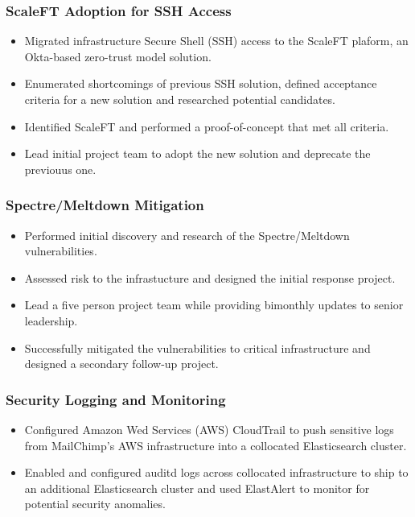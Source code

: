 \documentclass[letterpaper]{article}
\begin{document}
\subsubsection*{ScaleFT Adoption for SSH Access}
\begin{itemize}[noitemsep]
	\item Migrated infrastructure Secure Shell (SSH) access to the ScaleFT plaform, an Okta-based zero-trust model solution.
	\item Enumerated shortcomings of previous SSH solution, defined acceptance criteria for a new solution and researched potential candidates.
	\item Identified ScaleFT and performed a proof-of-concept that met all criteria.
	\item Lead initial project team to adopt the new solution and deprecate the previouus one.
\end{itemize}
\subsubsection*{Spectre/Meltdown Mitigation}
\begin{itemize}[noitemsep]
	\item Performed initial discovery and research of the Spectre/Meltdown vulnerabilities.
	\item Assessed risk to the infrastucture and designed the initial response project.
	\item Lead a five person project team while providing bimonthly updates to senior leadership.
	\item Successfully mitigated the vulnerabilities to critical infrastructure and designed a secondary follow-up project.
\end{itemize}
\subsubsection*{Security Logging and Monitoring}
\begin{itemize}[noitemsep]
	\item Configured Amazon Wed Services (AWS) CloudTrail to push sensitive logs from MailChimp's AWS infrastructure into a collocated Elasticsearch cluster.
	\item Enabled and configured auditd logs across collocated infrastructure to ship to an additional Elasticsearch cluster and used ElastAlert to monitor for potential security anomalies. 
\end{itemize}
\end{document}
